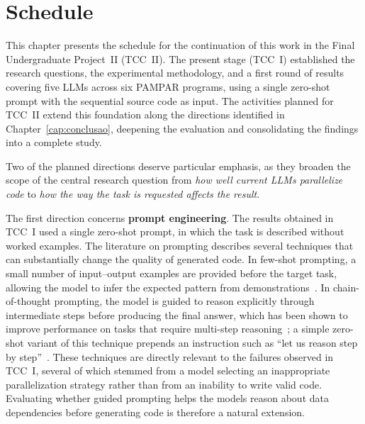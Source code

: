 \chapter{Schedule}\label{cap:implementacao}

This chapter presents the schedule for the continuation of this work in the
Final Undergraduate Project~II (TCC~II). The present stage (TCC~I) established
the research questions, the experimental methodology, and a first round of
results covering five LLMs across six PAMPAR programs, using a single
zero-shot prompt with the sequential source code as input. The activities
planned for TCC~II extend this foundation along the directions identified in
Chapter~\ref{cap:conclusao}, deepening the evaluation and consolidating the
findings into a complete study.

Two of the planned directions deserve particular emphasis, as they broaden the
scope of the central research question from \textit{how well current LLMs
parallelize code} to \textit{how the way the task is requested affects the
result}.

The first direction concerns \textbf{prompt engineering}. The results obtained
in TCC~I used a single zero-shot prompt, in which the task is described without
worked examples. The literature on prompting describes several techniques that
can substantially change the quality of generated code. In few-shot prompting,
a small number of input--output examples are provided before the target task,
allowing the model to infer the expected pattern from
demonstrations~. In chain-of-thought prompting, the
model is guided to reason explicitly through intermediate steps before producing
the final answer, which has been shown to improve performance on tasks that
require multi-step reasoning~; a simple zero-shot variant
of this technique prepends an instruction such as ``let us reason step by
step''~. These techniques are directly relevant
to the failures observed in TCC~I, several of which stemmed from a model
selecting an inappropriate parallelization strategy rather than from an inability
to write valid code. Evaluating whether guided prompting helps the models reason
about data dependencies before generating code is therefore a natural extension.

